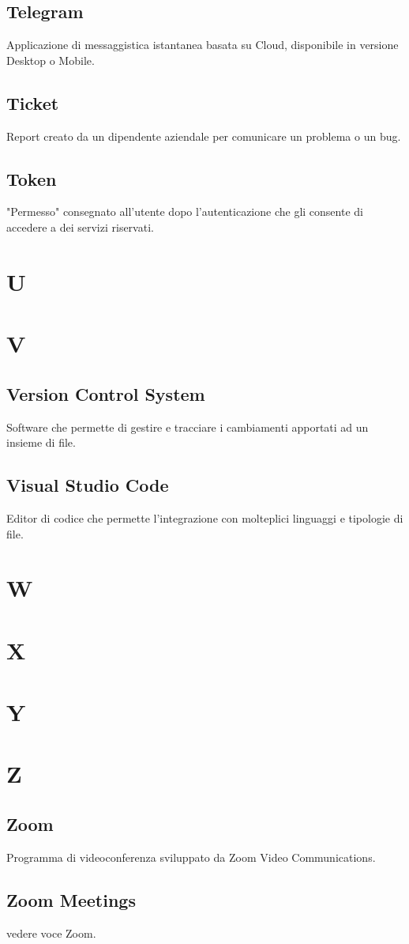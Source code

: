 \subsection{Telegram}
Applicazione di messaggistica istantanea basata su Cloud, disponibile in versione Desktop o Mobile.
\subsection{Ticket}
Report creato da un dipendente aziendale per comunicare un problema o un bug.
\subsection{Token}  
"Permesso" consegnato all'utente dopo l'autenticazione che gli consente di accedere a dei servizi riservati.
\newpage
\section{U}
\section{V}
\subsection{Version Control System}
Software che permette di gestire e tracciare i cambiamenti apportati ad un insieme di file.
\subsection{Visual Studio Code}
Editor di codice che permette l'integrazione con molteplici linguaggi e tipologie di file.
\newpage
\section{W}
\section{X}
\section{Y}
\section{Z}
\subsection{Zoom}
Programma di videoconferenza sviluppato da Zoom Video Communications.
\subsection{Zoom Meetings}
vedere voce Zoom.

